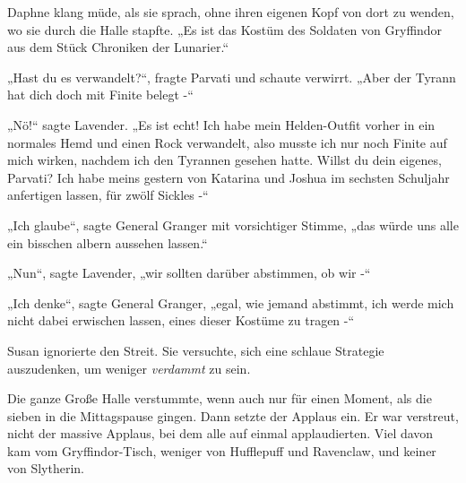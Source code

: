 {Daphne klang müde, als sie sprach, ohne ihren eigenen Kopf von dort zu wenden, wo sie durch die Halle stapfte. „Es ist das Kostüm des Soldaten von Gryffindor aus dem Stück Chroniken der Lunarier.“

„Hast du es verwandelt?“, fragte Parvati und schaute verwirrt. „Aber der Tyrann hat dich doch mit Finite belegt -“

„Nö!“ sagte Lavender. „Es ist echt! Ich habe mein Helden-Outfit vorher in ein normales Hemd und einen Rock verwandelt, also musste ich nur noch Finite auf mich wirken, nachdem ich den Tyrannen gesehen hatte. Willst du dein eigenes, Parvati? Ich habe meins gestern von Katarina und Joshua im sechsten Schuljahr anfertigen lassen, für zwölf Sickles -“

„Ich glaube“, sagte General Granger mit vorsichtiger Stimme, „das würde uns alle ein bisschen albern aussehen lassen.“

„Nun“, sagte Lavender, „wir sollten darüber abstimmen, ob wir -“

„Ich denke“, sagte General Granger, „egal, wie jemand abstimmt, ich werde mich nicht dabei erwischen lassen, eines dieser Kostüme zu tragen -“

Susan ignorierte den Streit. Sie versuchte, sich eine schlaue Strategie auszudenken, um weniger \emph{verdammt} zu sein.

Die ganze Große Halle verstummte, wenn auch nur für einen Moment, als die sieben in die Mittagspause gingen. Dann setzte der Applaus ein. Er war verstreut, nicht der massive Applaus, bei dem alle auf einmal applaudierten. Viel davon kam vom Gryffindor-Tisch, weniger von Hufflepuff und Ravenclaw, und keiner von Slytherin.

}

